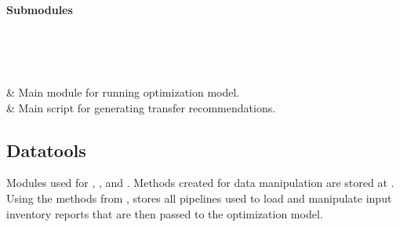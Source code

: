 \documentclass[letterpaper,10pt,english]{sphinxmanual}
\begin{document}
\paragraph{Submodules}
\label{\detokenize{source/optimization.model:submodules}}

\begin{savenotes}\sphinxatlongtablestart\begin{longtable}[c]{}
\hline

\endfirsthead

%
{}\\
\hline

\endhead

\hline
{}\\
\endfoot

\endlastfoot

{\hyperref[\detokenize{source/optimization.model:module-optimization.model.main}]{}}
&
Main  module for running optimization model.
\\
\hline
{\hyperref[\detokenize{source/optimization.model:module-optimization.model.optimizer}]{}}
&
Main script for generating transfer recommendations.
\\
\hline
\end{longtable}\sphinxatlongtableend\end{savenotes}


\subsection{Datatools}
\label{\detokenize{source/optimization.datatools:datatools}}\label{\detokenize{source/optimization.datatools::doc}}
Modules used for , ,  and .
Methods created for data manipulation are stored at {\hyperref[\detokenize{source/optimization.datatools:module-optimization.datatools.dataprep}]{}}.
Using the methods from {\hyperref[\detokenize{source/optimization.datatools:module-optimization.datatools.dataprep}]{}}, {\hyperref[\detokenize{source/optimization.datatools:module-optimization.datatools.pipelines}]{}} stores
all pipelines used to load and manipulate input inventory reports that are then passed to the optimization model.
\end{document}
